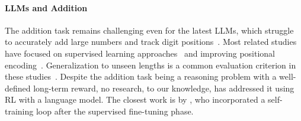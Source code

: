\paragraph{LLMs and Addition} The addition task remains challenging even for the latest LLMs, which struggle to accurately add large numbers and track digit positions~\citep{wallace-etal-2019-nlp}. Most related studies have focused on supervised learning approaches~\citep{lee2023teachingarithmeticsmalltransformers, mcleish2024transformersarithmeticrightembeddings} and improving positional encoding~\citep{shen2023positionaldescriptionmatterstransformers, kazemnejad2023impactpositionalencodinglength,mcleish2024transformersarithmeticrightembeddings, zhou2024transformersachievelengthgeneralization}. Generalization to unseen lengths is a common evaluation criterion in these studies~\citep{kazemnejad2023impactpositionalencodinglength, xiao2023conditionslengthgeneralizationlearning, zhou2024transformersachievelengthgeneralization}.
Despite the addition task being a reasoning problem with a well-defined long-term reward, no research, to our knowledge, has addressed it using RL with a language model.
The closest work is by \citet{zhang2023chainofthoughtreasoningpolicyimprovement}, who incorporated a self-training loop after the supervised fine-tuning phase.




